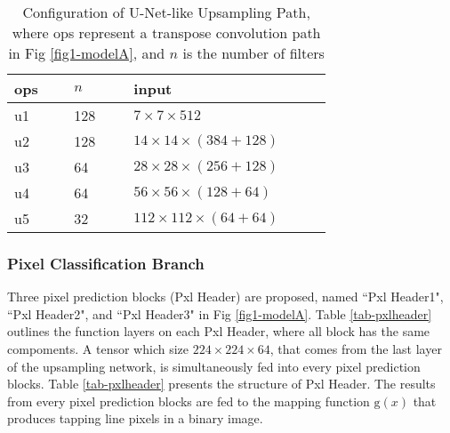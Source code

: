 \documentclass[default,pdflatex,iicol]{sn-jnl}%
\begin{document}
\begin{table}[]
\centering
\caption{Configuration of U-Net-like Upsampling Path, where ops represent a transpose convolution path in Fig \ref{fig1-modelA}, and $n$ is the number of filters}
\label{tab-unetpath}
\begin{minipage}{\linewidth}
\begin{center}
\begin{tabular}{p{0.15\linewidth}p{0.15\linewidth}p{0.5\linewidth}}%
\toprule
ops 	& $n$ 	& \textbf{input}  					\\ \midrule
u1	&128	    & $7 \times 7 \times 512$              	        \\
u2	&128	    & $14 \times 14 \times (384+128)$    	     \\ 
u3	&64	    & $28 \times 28 \times (256+128)$    	       \\
u4	&64	    & $56 \times 56 \times (128+64)$      	        \\
u5	&32	    & $112 \times 112 \times (64+64)$    	        \\ 
\bottomrule
\end{tabular}%
\end{center}
\end{minipage}
\end{table}

\subsubsection{Pixel Classification Branch}
Three pixel prediction blocks (Pxl Header) are proposed, named ``Pxl Header1", ``Pxl Header2", and ``Pxl Header3" in Fig \ref{fig1-modelA}. Table \ref{tab-pxlheader} outlines the function layers on each Pxl Header, where all block has the same compoments. A tensor which size $224 \times 224 \times 64$, that comes from the last layer of the upsampling network, is simultaneously fed into every pixel prediction blocks. Table \ref{tab-pxlheader} presents the structure of Pxl Header. The results from every pixel prediction blocks are fed to the mapping function $\mathrm{g}(x)$ that produces tapping line pixels in a binary image.
\end{document}
